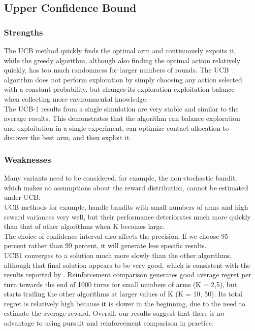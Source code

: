 \subsection{Upper Confidence Bound}\label{subsec:upper-confidence-bound2}

\subsubsection{Strengths}
The UCB method quickly finds the optimal arm and continuously expoits it, while the greedy algorithm, although also finding the optimal action relatively quickly, has too much randomness for larger numbers of rounds.
The UCB algorithm does not perform exploration by simply choosing any action selected with a constant probability, but changes its exploration-exploitation balance when collecting more environmental knowledge.
\\The UCB-1 results from a single simulation are very stable and similar to the average results.
This demonstrates that the algorithm can balance exploration and exploitation in a single experiment, can optimize contact allocation to discover the best arm, and then exploit it.

\subsubsection{Weaknesses}
Many variants need to be considered, for example, the non-stochastic bandit, which makes no assumptions about the reward distribution, cannot be estimated under UCB.
\\UCB methods for example, handle bandits with small numbers of arms and high reward variances very well, but their performance deteriorates much more quickly than that of other algorithms when K becomes large.\citep{Kuleshov}
\\The choice of confidence interval also affects the precision.
If we choose 95 percent rather than 99 percent, it will generate less specific results.
\\UCB1 converges to a solution much more slowly than the other algorithms, although that final solution appears to be very good, which is consistent with the results reported by \cite{Auer2002}.
Reinforcement comparison generates good average regret per turn towards the end of 1000 turns for small numbers of arms (K = 2,5), but starts trailing the other algorithms at larger values of K (K = 10, 50).
Its total regret is relatively high because it is slower in the beginning, due to the need to estimate the average reward. Overall, our results suggest that there is no advantage to using pursuit and reinforcement comparison in practice. \citep{Kuleshov}


